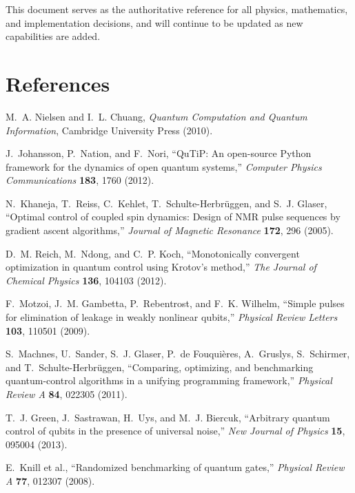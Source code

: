 \documentclass[11pt,a4paper]{article}
\theoremstyle{definition}
\theoremstyle{remark}
\begin{document}
This document serves as the authoritative reference for all physics, mathematics, and implementation decisions, and will continue to be updated as new capabilities are added.

\section*{References}

\begin{enumerate}[label={[\arabic*]}]
    \item M.~A. Nielsen and I.~L. Chuang, \emph{Quantum Computation and Quantum Information}, Cambridge University Press (2010).
    \item J.~Johansson, P.~Nation, and F.~Nori, ``QuTiP: An open-source Python framework for the dynamics of open quantum systems,'' \emph{Computer Physics Communications} \textbf{183}, 1760 (2012).
    \item N.~Khaneja, T.~Reiss, C.~Kehlet, T.~Schulte-Herbr\"uggen, and S.~J. Glaser, ``Optimal control of coupled spin dynamics: Design of NMR pulse sequences by gradient ascent algorithms,'' \emph{Journal of Magnetic Resonance} \textbf{172}, 296 (2005).
    \item D.~M. Reich, M.~Ndong, and C.~P. Koch, ``Monotonically convergent optimization in quantum control using Krotov's method,'' \emph{The Journal of Chemical Physics} \textbf{136}, 104103 (2012).
    \item F.~Motzoi, J.~M. Gambetta, P.~Rebentrost, and F.~K. Wilhelm, ``Simple pulses for elimination of leakage in weakly nonlinear qubits,'' \emph{Physical Review Letters} \textbf{103}, 110501 (2009).
    \item S.~Machnes, U.~Sander, S.~J. Glaser, P.~de Fouquières, A.~Gruslys, S.~Schirmer, and T.~Schulte-Herbr\"uggen, ``Comparing, optimizing, and benchmarking quantum-control algorithms in a unifying programming framework,'' \emph{Physical Review A} \textbf{84}, 022305 (2011).
    \item T.~J. Green, J.~Sastrawan, H.~Uys, and M.~J. Biercuk, ``Arbitrary quantum control of qubits in the presence of universal noise,'' \emph{New Journal of Physics} \textbf{15}, 095004 (2013).
    \item E.~Knill et al., ``Randomized benchmarking of quantum gates,'' \emph{Physical Review A} \textbf{77}, 012307 (2008).

\end{enumerate}
\end{document}
